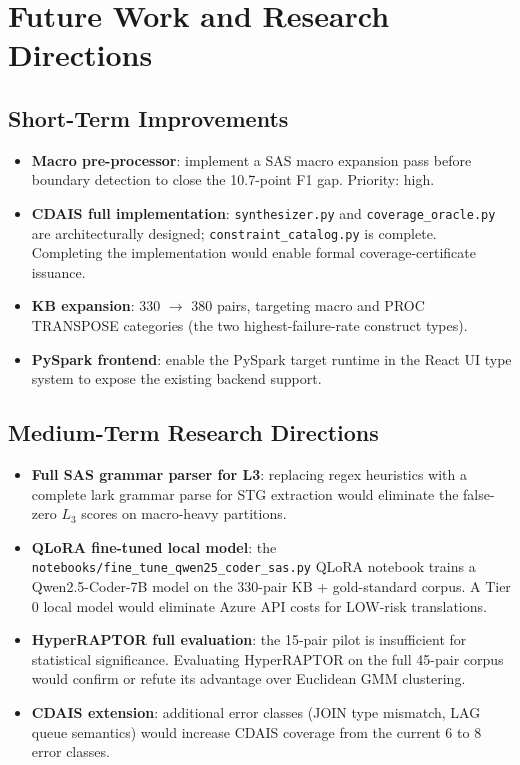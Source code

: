 \section{Future Work and Research Directions}
\label{sec:future-work}

\subsection{Short-Term Improvements}
\label{subsec:future-short-term}

\begin{itemize}
  \item \textbf{Macro pre-processor}: implement a SAS macro expansion pass
    before boundary detection to close the 10.7-point F1 gap. Priority: high.
  \item \textbf{CDAIS full implementation}: \texttt{synthesizer.py} and
    \texttt{coverage\_oracle.py} are architecturally designed;
    \texttt{constraint\_catalog.py} is complete. Completing the implementation
    would enable formal coverage-certificate issuance.
  \item \textbf{KB expansion}: 330 $\rightarrow$ 380 pairs, targeting
    macro and PROC TRANSPOSE categories (the two highest-failure-rate
    construct types).
  \item \textbf{PySpark frontend}: enable the PySpark target runtime in the
    React UI type system to expose the existing backend support.
\end{itemize}

\subsection{Medium-Term Research Directions}
\label{subsec:future-mid-term}

\begin{itemize}
  \item \textbf{Full SAS grammar parser for L3}: replacing regex heuristics
    with a complete lark grammar parse for STG extraction would eliminate the
    false-zero $L_3$ scores on macro-heavy partitions.
  \item \textbf{QLoRA fine-tuned local model}: the
    \texttt{notebooks/fine\_tune\_qwen25\_coder\_sas.py} QLoRA notebook trains
    a Qwen2.5-Coder-7B model on the 330-pair KB + gold-standard corpus. A
    Tier 0 local model would eliminate Azure API costs for LOW-risk translations.
  \item \textbf{HyperRAPTOR full evaluation}: the 15-pair pilot is insufficient
    for statistical significance. Evaluating HyperRAPTOR on the full 45-pair
    corpus would confirm or refute its advantage over Euclidean GMM clustering.
  \item \textbf{CDAIS extension}: additional error classes (JOIN type mismatch,
    LAG queue semantics) would increase CDAIS coverage from the current 6 to 8
    error classes.
\end{itemize}

